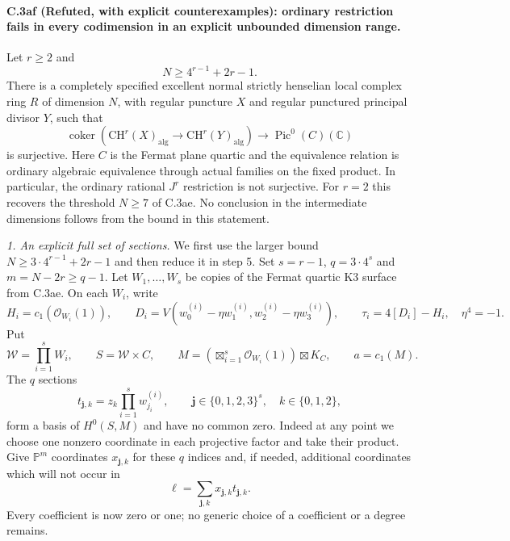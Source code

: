 \paragraph{C.3af (Refuted, with explicit counterexamples): ordinary restriction fails in every codimension in an explicit unbounded dimension range.}
Let $r\ge2$ and
\[
                         N\ge 4^{r-1}+2r-1.
\]
There is a completely specified excellent normal strictly
henselian local complex ring $R$ of dimension $N$, with
regular puncture $X$ and regular punctured principal divisor
$Y$, such that
\begin{equation}\label{eq:C3af-cokernel}
 \operatorname{coker}\!\left(
 \mathrm{CH}^r(X)_{\mathrm{alg}}
       \longrightarrow\mathrm{CH}^r(Y)_{\mathrm{alg}}\right)
          \longrightarrow\operatorname{Pic}^0(C)(\mathbb C)
\end{equation}
is surjective. Here $C$ is the Fermat plane quartic and
the equivalence relation is ordinary algebraic equivalence
through actual families on the fixed product. In particular,
the ordinary rational $J^r$ restriction is not surjective.
For $r=2$ this recovers the threshold $N\ge7$ of C.3ae.
No conclusion in the intermediate dimensions follows from
the bound in this statement.

\emph{1. An explicit full set of sections.}
We first use the larger bound
$N\ge3\cdot4^{r-1}+2r-1$ and then reduce it in step 5.
Set $s=r-1$, $q=3\cdot4^s$ and $m=N-2r\ge q-1$.
Let $W_1,\ldots,W_s$ be copies of the Fermat quartic K3
surface from C.3ae. On each $W_i$, write
\[
 H_i=c_1(\mathcal O_{W_i}(1)),\qquad
 D_i=V(w^{(i)}_0-\eta w^{(i)}_1,
        w^{(i)}_2-\eta w^{(i)}_3),\qquad
 \tau_i=4[D_i]-H_i,
 \quad\eta^4=-1.
\]
Put
\[
 \mathcal W=\prod_{i=1}^s W_i,\qquad
 S=\mathcal W\times C,\qquad
 M=\left(\boxtimes_{i=1}^s\mathcal O_{W_i}(1)\right)\boxtimes K_C,
 \qquad a=c_1(M).
\]
The $q$ sections
\begin{equation}\label{eq:C3af-sections}
       t_{\mathbf j,k}
          =z_k\prod_{i=1}^s w^{(i)}_{j_i},
 \qquad \mathbf j\in\{0,1,2,3\}^s,\quad k\in\{0,1,2\},
\end{equation}
form a basis of $H^0(S,M)$ and have no common zero.
Indeed at any point we choose one nonzero coordinate in
each projective factor and take their product. Give
$\mathbb P^m$ coordinates $x_{\mathbf j,k}$ for these
$q$ indices and, if needed, additional coordinates which
will not occur in
\[
                      \ell=\sum_{\mathbf j,k}
                            x_{\mathbf j,k}t_{\mathbf j,k}.
\]
Every coefficient is now zero or one; no generic choice
of a coefficient or a degree remains.

